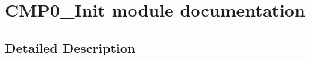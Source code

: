 \hypertarget{group___c_m_p0___init__module}{}\section{C\+M\+P0\+\_\+\+Init module documentation}
\label{group___c_m_p0___init__module}


\subsection{Detailed Description}
